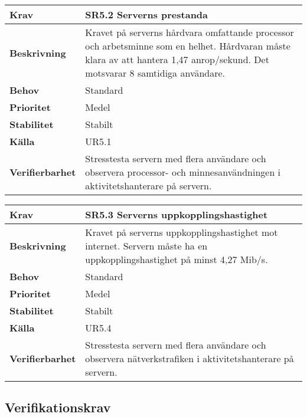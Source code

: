 \documentclass[a4paper, twoside, 11pt, titlepage]{article}
\begin{document}
	\begin {table} [ht] \begin{tabular} { p{2.6cm} p{12.5cm} }
		\hline
		\sffamily\textbf{Krav} & \sffamily\textbf{SR5.2 Serverns prestanda } \\
		\hline
		\sffamily\textbf{Beskrivning} & Kravet på serverns hårdvara omfattande processor och arbetsminne som en helhet. Hårdvaran måste klara av att hantera 1,47 anrop/sekund. Det motsvarar 8 samtidiga användare.  \\
		\hline
		\sffamily\textbf{Behov} & Standard  \\
		\hline
		\sffamily\textbf{Prioritet} & Medel  \\
		\hline
		\sffamily\textbf{Stabilitet} & Stabilt  \\
		\hline
		\sffamily\textbf{Källa} & UR5.1  \\
		\hline
		\sffamily\textbf{Verifierbarhet} & Stresstesta servern med flera användare och observera processor- och minnesanvändningen i aktivitetshanterare på servern.  \\
		\hline
	\end{tabular} \end{table} \FloatBarrier
	\vspace{6mm}

	\begin {table} [ht] \begin{tabular} { p{2.6cm} p{12.5cm} }
		\hline
		\sffamily\textbf{Krav} & \sffamily\textbf{SR5.3 Serverns uppkopplingshastighet } \\
		\hline
		\sffamily\textbf{Beskrivning} & Kravet på serverns uppkopplingshastighet mot internet. Servern måste ha en uppkopplingshastighet på minst 4,27 Mib/s.  \\
		\hline
		\sffamily\textbf{Behov} & Standard  \\
		\hline
		\sffamily\textbf{Prioritet} & Medel  \\
		\hline
		\sffamily\textbf{Stabilitet} & Stabilt  \\
		\hline
		\sffamily\textbf{Källa} & UR5.4  \\
		\hline
		\sffamily\textbf{Verifierbarhet} & Stresstesta servern med flera användare och observera nätverkstrafiken i aktivitetshanterare på servern.  \\
		\hline
	\end{tabular} \end{table} \FloatBarrier


	\subsection{Verifikationskrav}
\end{document}
